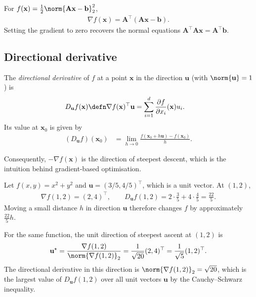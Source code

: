 \documentclass[a4paper, 12pt]{book}
\begin{document}
\begin{example}
    For $f(\mathbf{x})=\frac12\norm{\mathbf{A}\mathbf{x}-\mathbf{b}}_2^2$,
    \begin{align}
        \nabla f(\mathbf{x})
        = \mathbf{A}^\top(\mathbf{A}\mathbf{x}-\mathbf{b}).
    \end{align}
    Setting the gradient to zero recovers the normal equations
    $\mathbf{A}^\top\mathbf{A}\mathbf{x}=\mathbf{A}^\top\mathbf{b}$.
\end{example}

\subsection{Directional derivative}
\begin{definition}
    The \emph{directional derivative} of $f$ at a point $\mathbf{x}$ in the direction $\mathbf{u}$ (with $\norm{\mathbf{u}}=1$) is
    \begin{align}
    D_{\mathbf{u}} f(\mathbf{x}) &\defn \nabla f(\mathbf{x})^\top \mathbf{u}
    = \sum_{i=1}^{d} \frac{\partial f}{\partial x_i}(\mathbf{x}) u_i.
    \end{align}
    Its value at $\mathbf{x}_0$ is given by
    \begin{align}
          (D_{\mathbf{u}} f)(\mathbf{x}_0)
          &= \lim_{h \to 0} \frac{f(\mathbf{x}_0 + h\mathbf{u}) - f(\mathbf{x}_0)}{h}.
    \end{align}
\end{definition}
Consequently, $-\nabla f(\mathbf{x})$ is the direction of steepest descent, which is
the intuition behind gradient-based optimisation.

\begin{example}
    Let $f(x,y)=x^2+y^2$ and $\mathbf{u}=(3/5,4/5)^\top$, which is a unit vector.
    At $(1,2)$,
    \begin{align}
        \nabla f(1,2) = (2,4)^\top,
        \qquad
        D_{\mathbf{u}}f(1,2) = 2\cdot\frac35 + 4\cdot\frac45 = \frac{22}{5}.
    \end{align}
    Moving a small distance $h$ in direction $\mathbf{u}$ therefore changes $f$ by
    approximately $\frac{22}{5}h$.
\end{example}

\begin{example}
    For the same function, the unit direction of steepest ascent at $(1,2)$ is
    \begin{align}
        \mathbf{u}^\star = \frac{\nabla f(1,2)}{\norm{\nabla f(1,2)}_2}
        = \frac{1}{\sqrt{20}}(2,4)^\top = \frac{1}{\sqrt5}(1,2)^\top.
    \end{align}
    The directional derivative in this direction is
    $\norm{\nabla f(1,2)}_2=\sqrt{20}$, which is the largest value of
    $D_{\mathbf{u}}f(1,2)$ over all unit vectors $\mathbf{u}$ by the
    Cauchy--Schwarz inequality.
\end{example}
\end{document}
